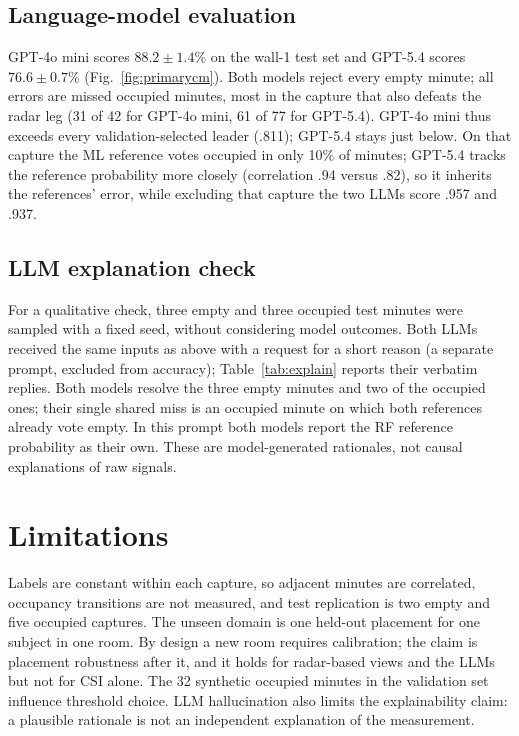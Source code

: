 \documentclass[conference,10pt,letterpaper]{IEEEtran}
\begin{document}
\subsection{Language-model evaluation}
GPT-4o mini scores $88.2\pm1.4$\% on the wall-1 test set and GPT-5.4 scores $76.6\pm0.7$\% (Fig.~\ref{fig:primarycm}). Both models reject every empty minute; all errors are missed occupied minutes, most in the capture that also defeats the radar leg (31 of 42 for GPT-4o mini, 61 of 77 for GPT-5.4). GPT-4o mini thus exceeds every validation-selected leader (.811); GPT-5.4 stays just below. On that capture the ML reference votes occupied in only 10\% of minutes; GPT-5.4 tracks the reference probability more closely (correlation .94 versus .82), so it inherits the references' error, while excluding that capture the two LLMs score .957 and .937.

\subsection{LLM explanation check}
For a qualitative check, three empty and three occupied test minutes were sampled with a fixed seed, without considering model outcomes. Both LLMs received the same inputs as above with a request for a short reason (a separate prompt, excluded from accuracy); Table~\ref{tab:explain} reports their verbatim replies. Both models resolve the three empty minutes and two of the occupied ones; their single shared miss is an occupied minute on which both references already vote empty. In this prompt both models report the RF reference probability as their own. These are model-generated rationales, not causal explanations of raw signals.

\section{Limitations}\label{sec:limits}
Labels are constant within each capture, so adjacent minutes are correlated, occupancy transitions are not measured, and test replication is two empty and five occupied captures. The unseen domain is one held-out placement for one subject in one room. By design a new room requires calibration; the claim is placement robustness after it, and it holds for radar-based views and the LLMs but not for CSI alone. The 32 synthetic occupied minutes in the validation set influence threshold choice. LLM hallucination also limits the explainability claim: a plausible rationale is not an independent explanation of the measurement.
\end{document}

